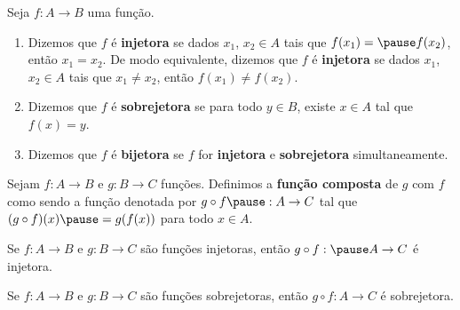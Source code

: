 \documentclass{beamer}
\begin{document}
    \begin{frame}
        \begin{definicao}
            Seja $f : A \to B$ uma função.\pause
            \begin{enumerate}[label={\roman*})]
                \item Dizemos que $f$ é \textbf{injetora} \pause se dados $x_1$, \pause $x_2 \in A$ \pause tais que $f(x_1) = \pause f(x_2)$, \pause então $x_1 = x_2$. \pause De modo equivalente, \pause dizemos que $f$ é \textbf{injetora} \pause se dados $x_1$, \pause $x_2 \in A$ \pause tais que $x_1 \ne x_2$, \pause então $f(x_1) \ne f(x_2)$.\pause

                \vspace{.3cm}

                \item Dizemos que $f$ é \textbf{sobrejetora} \pause se para todo $y \in B$, \pause existe $x \in A$ \pause tal que $f(x) = y$.\pause

                \vspace{.3cm}

                \item Dizemos que $f$ é \textbf{bijetora} \pause se $f$ for \textbf{injetora} \pause e \textbf{sobrejetora} \pause simultaneamente.
            \end{enumerate}
        \end{definicao}
    \end{frame}
    \begin{frame}
        \vspace{1cm}
        \begin{definicao}
            Sejam $f : A \to B$ \pause e $g : B \to C$ \pause funções. \pause Definimos a \textbf{função composta} \pause de $g$ com $f$ \pause como sendo a função denotada por $g \circ f \pause : A \to C$ \pause tal que \pause $(g\circ f)(x) \pause = g(f(x))$ \pause para todo $x \in A$.
        \end{definicao}
    \end{frame}

    \begin{frame}
        \begin{proposicao}
            Se $f : A \to B$ \pause e $g : B \to C$ \pause são funções injetoras, \pause então $g\circ f : \pause A \to C$ \pause é injetora.
        \end{proposicao}
    \end{frame}

    \begin{frame}
        \begin{proposicao}
            Se $f : A \to B$ \pause e $g : B \to C$ \pause são funções sobrejetoras, \pause então $g\circ f : A \to C$ \pause é sobrejetora.
        \end{proposicao}
    \end{frame}
\end{document}
